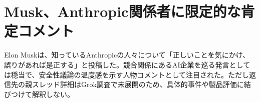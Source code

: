 \section{Musk、Anthropic関係者に限定的な肯定コメント}
Elon Muskは、知っているAnthropicの人々について「正しいことを気にかけ、誤りがあれば是正する」と投稿した。競合関係にあるAI企業を巡る発言としては穏当で、安全性議論の温度感を示す人物コメントとして注目された。ただし返信先の親スレッド詳細はGrok調査で未展開のため、具体的事件や製品評価に結びつけて解釈しない。

